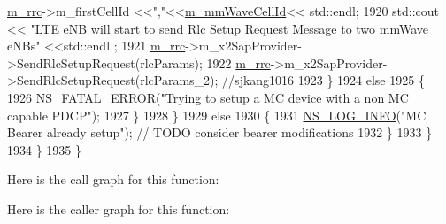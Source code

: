 \begin{DoxyCode}
      \hyperlink{classns3_1_1UeManager_ab4405e9f354c66e7c1a4c95832290f5b}{m\_rrc}->m\_firstCellId  <<\textcolor{stringliteral}{","}<<\hyperlink{classns3_1_1UeManager_a0f53cb816bd8a3ad6227dc9adca671b2}{m\_mmWaveCellId}<< std::endl;
1920          std::cout << \textcolor{stringliteral}{"LTE eNB will start to send Rlc Setup Request Message to two mmWave eNBs"} <<std::endl
      ;
1921           \hyperlink{classns3_1_1UeManager_ab4405e9f354c66e7c1a4c95832290f5b}{m\_rrc}->m\_x2SapProvider->SendRlcSetupRequest(rlcParams);
1922          \hyperlink{classns3_1_1UeManager_ab4405e9f354c66e7c1a4c95832290f5b}{m\_rrc}->m\_x2SapProvider->SendRlcSetupRequest(rlcParams\_2); \textcolor{comment}{//sjkang1016}
1923         \}
1924         \textcolor{keywordflow}{else}
1925         \{
1926           \hyperlink{group__fatal_ga5131d5e3f75d7d4cbfd706ac456fdc85}{NS\_FATAL\_ERROR}(\textcolor{stringliteral}{"Trying to setup a MC device with a non MC capable PDCP"});
1927         \}  
1928       \}
1929       \textcolor{keywordflow}{else}
1930       \{
1931         \hyperlink{group__logging_gafbd73ee2cf9f26b319f49086d8e860fb}{NS\_LOG\_INFO}(\textcolor{stringliteral}{"MC Bearer already setup"}); \textcolor{comment}{// TODO consider bearer modifications}
1932       \}  
1933     \}
1934   \}
1935 \}
\end{DoxyCode}


Here is the call graph for this function\+:




Here is the caller graph for this function\+:


